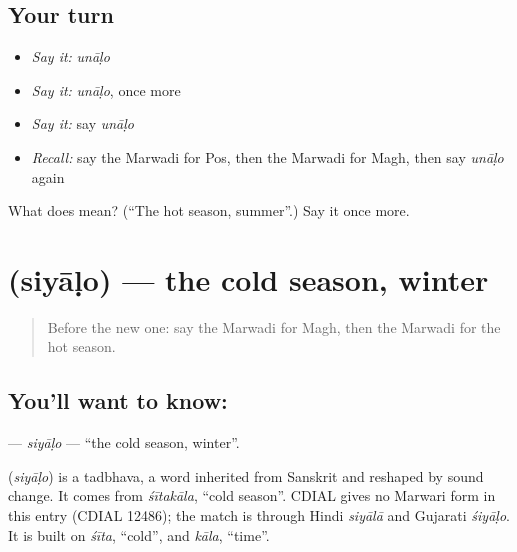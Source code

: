 \subsection*{Your turn}
\begin{itemize}
\raggedright
  \item \emph{Say it:} \emph{unāḷo}
  \item \emph{Say it:} \emph{unāḷo}, once more
  \item \emph{Say it:} say \emph{unāḷo}
  \item \emph{Recall:} say the Marwadi for Pos, then the Marwadi for Magh, then say \emph{unāḷo} again
\end{itemize}

\begin{tcolorbox}[breakable,colback=teal!4,colframe=teal!35!black,title={Before you move on}]
What does  mean? (\textquotedblleft{}The hot season, summer\textquotedblright{}.) Say it once more.
\end{tcolorbox}
\section[\texorpdfstring{\mw{सियाळो} (siyāḷo)}{सियाळो (siyāḷo)}]{ (siyāḷo) — the cold season, winter}

\label{lesson:MW-C94-siyalo}



\begin{quote}
Before the new one: say the Marwadi for Magh, then the Marwadi for the hot season.
\end{quote}

\subsection*{You'll want to know: }
\textbf{} — \emph{siyāḷo} — \textquotedblleft{}the cold season, winter\textquotedblright{}.

\begin{cousinweb}
\textbf{} (\emph{siyāḷo}) is a tadbhava, a word inherited from Sanskrit and reshaped by sound change. It comes from \emph{śītakāla}, \textquotedblleft{}cold season\textquotedblright{}. CDIAL gives no Marwari form in this entry (CDIAL 12486); the match is through Hindi \emph{siyālā} and Gujarati \emph{śiyāḷo}. It is built on \emph{śīta}, \textquotedblleft{}cold\textquotedblright{}, and \emph{kāla}, \textquotedblleft{}time\textquotedblright{}.
\end{cousinweb}

